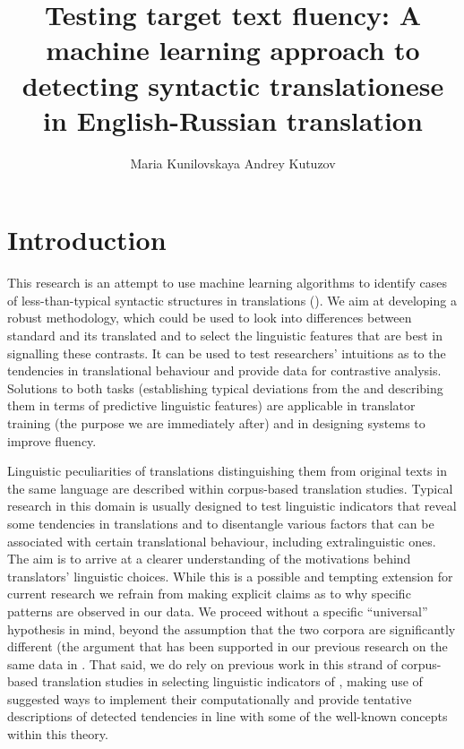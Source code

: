 \documentclass[output=paper]{langsci/langscibook.cls}
\author{Maria Kunilovskaya\affiliation{University of Tyumen}\lastand 
Andrey Kutuzov\affiliation{University of Oslo} 
}
\title{Testing target text fluency: A machine learning approach to detecting syntactic translationese in English-Russian translation}
\begin{document}
\maketitle
\section{Introduction}\label{sec:andrey:intro}

This research is an attempt to use machine learning algorithms to identify cases of less-than-typical syntactic structures in  translations (). We aim at developing a robust methodology, which could be used to look into differences between standard  and its translated  and to select the linguistic features that are best in signalling these contrasts. It can be used to test researchers' intuitions as to the tendencies in translational behaviour and provide data for contrastive analysis. Solutions to both tasks (establishing typical deviations from the  and describing them in terms of predictive linguistic features) are applicable in translator training (the purpose we are immediately after) and in designing  systems to improve fluency. 

Linguistic peculiarities of translations distinguishing them from original texts in the same language are described within corpus-based translation studies. Typical research in this domain is usually designed to test linguistic indicators that reveal some tendencies in translations and to disentangle various factors that can be associated with certain translational behaviour, including extralinguistic ones. The aim is to arrive at a clearer understanding of the motivations behind translators' linguistic choices. While this is a possible and tempting extension for current research we refrain from making explicit claims as to why specific patterns are observed in our data. We proceed without a specific ``universal'' hypothesis in mind, beyond the assumption that the two corpora are significantly different (the argument that has been supported in our previous research on the same data in \citet{Kunilovskaya:2015}. That said, we do rely on previous work in this strand of corpus-based translation studies in selecting linguistic indicators of , making use of suggested ways to implement their  computationally and provide tentative descriptions of detected tendencies in line with some of the well-known concepts within this theory.  
\end{document}
